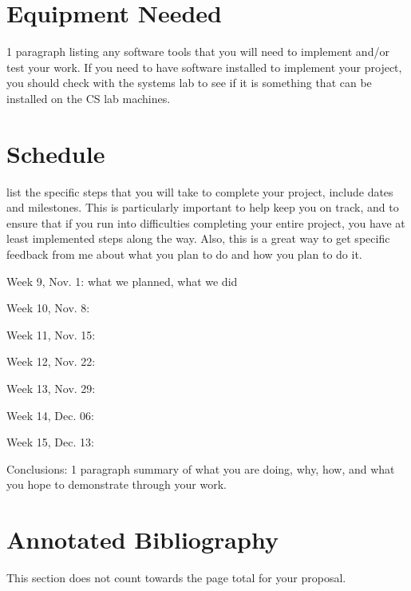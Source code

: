 \documentclass[11pt]{article}
\newenvironment{my_enumerate}{
  \begin{enumerate}
    \setlength{\itemsep}{1pt}
      \setlength{\parskip}{0pt}
\setlength{\parsep}{0pt}}{\end{enumerate}
}
\begin{document}
\section {Equipment Needed}\label{equip}
1 paragraph listing any software tools that you will need to implement and/or
test your work. If you need to have software installed to implement your
project, you should check with the systems lab to see if it is something that
can be installed on the CS lab machines.

\section {Schedule}\label{sched}
list the specific steps that you will take to complete your project, include
dates and milestones. This is particularly important to help keep you on track,
and to ensure that if you run into difficulties completing your entire project,
you have at least implemented steps along the way. Also, this is a great way to
get specific feedback from me about what you plan to do and how you plan to do
it.  



\begin{my_enumerate}
  \item Week 9, Nov. 1: what we planned, what we did 
  \item Week 10, Nov. 8: 
  \item Week 11, Nov. 15: 
  \item Week 12, Nov. 22: 
  \item Week 13, Nov. 29: 
  \item Week 14, Dec. 06: 
  \item Week 15, Dec. 13: 
\end{my_enumerate} 


Conclusions: 1 paragraph summary of what you are doing, why, how, and what
you hope to demonstrate through your work.




\newpage 

\onecolumn
\section*{Annotated Bibliography}\label{annon} 

This section does not count towards the page total for your proposal.
\end{document}
